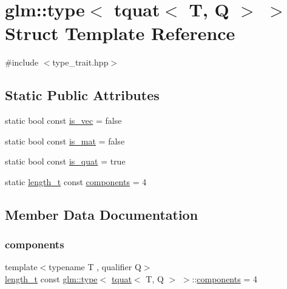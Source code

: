 \hypertarget{structglm_1_1type_3_01tquat_3_01_t_00_01_q_01_4_01_4}{}\section{glm\+:\+:type$<$ tquat$<$ T, Q $>$ $>$ Struct Template Reference}
\label{structglm_1_1type_3_01tquat_3_01_t_00_01_q_01_4_01_4}


{\ttfamily \#include $<$type\+\_\+trait.\+hpp$>$}

\subsection*{Static Public Attributes}
\begin{DoxyCompactItemize}
\item 
static bool const \mbox{\hyperlink{structglm_1_1type_3_01tquat_3_01_t_00_01_q_01_4_01_4_a512e63470e03e15c743282a72c0798f3}{is\+\_\+vec}} = false
\item 
static bool const \mbox{\hyperlink{structglm_1_1type_3_01tquat_3_01_t_00_01_q_01_4_01_4_ae80840fbe701f0ada0f430b4e1dae9f1}{is\+\_\+mat}} = false
\item 
static bool const \mbox{\hyperlink{structglm_1_1type_3_01tquat_3_01_t_00_01_q_01_4_01_4_ad8a07885504f8eb9d56e1cfbdbc10a68}{is\+\_\+quat}} = true
\item 
static \mbox{\hyperlink{namespaceglm_a090a0de2260835bee80e71a702492ed9}{length\+\_\+t}} const \mbox{\hyperlink{structglm_1_1type_3_01tquat_3_01_t_00_01_q_01_4_01_4_a4b2822c2e37012f219864ba5c49e1210}{components}} = 4
\end{DoxyCompactItemize}


\subsection{Member Data Documentation}
\mbox{\label{structglm_1_1type_3_01tquat_3_01_t_00_01_q_01_4_01_4_a4b2822c2e37012f219864ba5c49e1210}} 
\subsubsection{\texorpdfstring{components}{components}}
{\footnotesize\ttfamily template$<$typename T , qualifier Q$>$ \\
\mbox{\hyperlink{namespaceglm_a090a0de2260835bee80e71a702492ed9}{length\+\_\+t}} const \mbox{\hyperlink{structglm_1_1type}{glm\+::type}}$<$ \mbox{\hyperlink{structglm_1_1tquat}{tquat}}$<$ T, Q $>$ $>$\+::\mbox{\hyperlink{_s_d_l__opengl__glext_8h_a3824c86dfa50d23068c74eafb87375c2}{components}} = 4\hspace{0.3cm}{\ttfamily [static]}}

